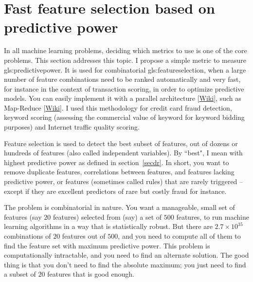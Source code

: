 \documentclass[oneside,10pt]{book}
\begin{document}

\section{Fast feature selection based on predictive power} 

In all machine learning problems, deciding which metrics to use is one of the core problems. This section addresses this topic. I propose a simple metric to measure \gls{gls:predictivepower}. It is used for combinatorial \gls{gls:featureselection}, when a large number of feature combinations need to be ranked automatically and very fast, for instance in the context of transaction scoring, in order to optimize predictive models. You can easily implement it with
 a \textcolor{index}{parallel architecture} [\href{https://en.wikipedia.org/wiki/Parallel_computing}{Wiki}], such as \textcolor{index}{Map-Reduce} [\href{https://en.wikipedia.org/wiki/MapReduce}{Wiki}]. I used this methodology for credit card fraud detection, keyword scoring (assessing the commercial value of keyword for keyword bidding purposes) and Internet traffic quality scoring. 

Feature selection is used to detect the best subset of features, out of dozens or hundreds of features (also called independent variables). By ``best", I mean with highest predictive power as defined in section~\ref{secdr}. In short, you want to remove duplicate features, correlations between features, and features lacking predictive power, or features (sometimes called rules) that are rarely triggered -- except if they are excellent predictors of rare but costly fraud for instance.

The problem is combinatorial in nature. You want a manageable, small set of features (say $20$ features) selected from (say) a set of $500$ features, to run machine learning algorithms  in a way that is statistically robust. But there are $2.7 \times 10^{35}$ combinations of $20$ features out of $500$, and you need to compute all of them to find the feature set with maximum predictive power. This problem is computationally intractable, and you need to find an alternate solution. The good thing is that you don’t need to find the absolute maximum; you just need to find a subset of $20$ features that is good enough.
\end{document}
